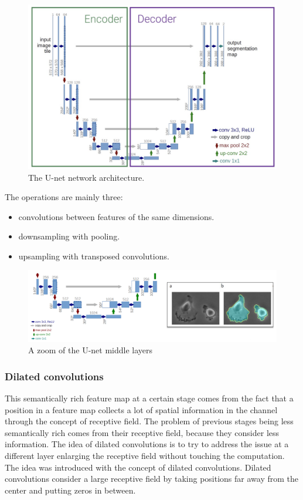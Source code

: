 \begin{figure}[htbp]
  \centering
  \includegraphics[width=0.7\linewidth]{./img/unet.jpg}
  \caption{The U-net network architecture.}
\end{figure}

The operations are mainly three:
\begin{itemize}
  \item convolutions between features of the same dimensions.
  \item downsampling with pooling.
  \item upsampling with transposed convolutions.
\end{itemize}

\begin{figure}[htbp]
  \centering
  \includegraphics[width=0.7\linewidth]{./img/unet_zoom.png}
  \caption{A zoom of the U-net middle layers}
\end{figure}

\subsubsection{Dilated convolutions}

This semantically rich feature map at a certain stage comes from the fact that a position in a feature map collects a lot of spatial information in the channel through the concept of receptive field.
The problem of previous stages being less semantically rich comes from their receptive field, because they consider less information.
The idea of dilated convolutions is to try to address the issue at a different layer enlarging the receptive field without touching the computation.
The idea was introduced with the concept of dilated convolutions.
Dilated convolutions consider a large receptive field by taking positions far away from the center and putting zeros in between.


